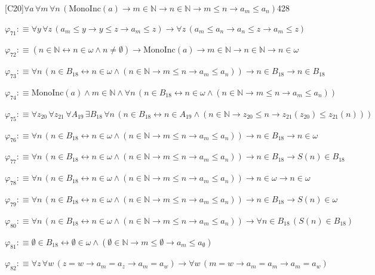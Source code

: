 \begin{fullproof}{[C20]}{$\forall a\,\forall m\,\forall n\,(\mathrm{MonoInc}(a) \to m \in \mathbb{N} \to n \in \mathbb{N} \to m \leq n \to a_{m} \leq a_{n})$}{428}
\begin{abbrevlist}
\item $\varphi_{71} :\equiv \forall y\,\forall z\,(a_{m} \leq y \to y \leq z \to a_{m} \leq z) \to \forall z\,(a_{m} \leq a_{n} \to a_{n} \leq z \to a_{m} \leq z)$
\item $\varphi_{72} :\equiv (n \in \mathbb{N} \leftrightarrow n \in \omega \land n \neq \emptyset) \to \mathrm{MonoInc}(a) \to m \in \mathbb{N} \to n \in \mathbb{N} \to n \in \omega$
\item $\varphi_{73} :\equiv \forall n\,(n \in B_{18} \leftrightarrow n \in \omega \land (n \in \mathbb{N} \to m \leq n \to a_{m} \leq a_{n})) \to n \in B_{18} \to n \in B_{18}$
\item $\varphi_{74} :\equiv \mathrm{MonoInc}(a) \land m \in \mathbb{N} \land \forall n\,(n \in B_{18} \leftrightarrow n \in \omega \land (n \in \mathbb{N} \to m \leq n \to a_{m} \leq a_{n}))$
\item $\varphi_{75} :\equiv \forall z_{20}\,\forall z_{21}\,\forall A_{19}\,\exists B_{18}\,\forall n\,(n \in B_{18} \leftrightarrow n \in A_{19} \land (n \in \mathbb{N} \to z_{20} \leq n \to z_{21}(z_{20}) \leq z_{21}(n)))$
\item $\varphi_{76} :\equiv \forall n\,(n \in B_{18} \leftrightarrow n \in \omega \land (n \in \mathbb{N} \to m \leq n \to a_{m} \leq a_{n})) \to n \in B_{18} \to n \in \omega$
\item $\varphi_{77} :\equiv \forall n\,(n \in B_{18} \leftrightarrow n \in \omega \land (n \in \mathbb{N} \to m \leq n \to a_{m} \leq a_{n})) \to n \in B_{18} \to S(n) \in B_{18}$
\item $\varphi_{78} :\equiv \forall n\,(n \in B_{18} \leftrightarrow n \in \omega \land (n \in \mathbb{N} \to m \leq n \to a_{m} \leq a_{n})) \to n \in \omega \to n \in \omega$
\item $\varphi_{79} :\equiv \forall n\,(n \in B_{18} \leftrightarrow n \in \omega \land (n \in \mathbb{N} \to m \leq n \to a_{m} \leq a_{n})) \to n \in B_{18} \to S(n) \in \omega$
\item $\varphi_{80} :\equiv \forall n\,(n \in B_{18} \leftrightarrow n \in \omega \land (n \in \mathbb{N} \to m \leq n \to a_{m} \leq a_{n})) \to \forall n \in B_{18}\,(S(n) \in B_{18})$
\item $\varphi_{81} :\equiv \emptyset \in B_{18} \leftrightarrow \emptyset \in \omega \land (\emptyset \in \mathbb{N} \to m \leq \emptyset \to a_{m} \leq a_{\emptyset})$
\item $\varphi_{82} :\equiv \forall z\,\forall w\,(z = w \to a_{m} = a_{z} \to a_{m} = a_{w}) \to \forall w\,(m = w \to a_{m} = a_{m} \to a_{m} = a_{w})$

\end{abbrevlist}
\end{fullproof}
